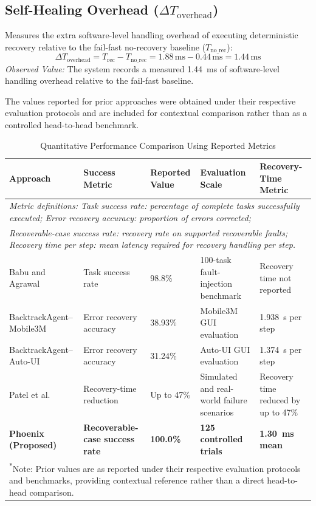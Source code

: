 \documentclass[conference]{IEEEtran}
\begin{document}
\subsection{Self-Healing Overhead ($\Delta T_{\text{overhead}}$)}
Measures the extra software-level handling overhead of executing deterministic recovery relative to the fail-fast no-recovery baseline ($T_{\text{no\_rec}}$):
\begin{equation}
\Delta T_{\text{overhead}} = T_{\text{rec}} - T_{\text{no\_rec}} = 1.88\,\text{ms} - 0.44\,\text{ms} = 1.44\,\text{ms}
\end{equation}
\textit{Observed Value:} The system records a measured 1.44~ms of software-level handling overhead relative to the fail-fast baseline.

The values reported for prior approaches were obtained under their respective evaluation protocols and are included for contextual comparison rather than as a controlled head-to-head benchmark.

\begin{table}[t]
\centering
\caption{Quantitative Performance Comparison Using Reported Metrics}
\label{tab:performance_comparison}
\footnotesize
\begin{tabularx}{\textwidth}{p{}p{}p{}p{}X}
\toprule
\textbf{Approach} & \textbf{Success Metric} & \textbf{Reported Value} & \textbf{Evaluation Scale} & \textbf{Recovery-Time Metric} \\
\midrule
\multicolumn{5}{l}{\textit{Metric definitions: Task success rate: percentage of complete tasks successfully executed; Error recovery accuracy: proportion of errors corrected;}} \\
\multicolumn{5}{l}{\textit{Recoverable-case success rate: recovery rate on supported recoverable faults; Recovery time per step: mean latency required for recovery handling per step.}} \\
\midrule
Babu and Agrawal~\cite{babu2026} & Task success rate & 98.8\% & 100-task fault-injection benchmark & Recovery time not reported \\
BacktrackAgent--Mobile3M~\cite{wu2025} & Error recovery accuracy & 38.93\% & Mobile3M GUI evaluation & 1.938~s per step \\
BacktrackAgent--Auto-UI~\cite{wu2025} & Error recovery accuracy & 31.24\% & Auto-UI GUI evaluation & 1.374~s per step \\
Patel et al.~\cite{patel2026b} & Recovery-time reduction & Up to 47\% & Simulated and real-world failure scenarios & Recovery time reduced by up to 47\% \\
\textbf{Phoenix (Proposed)} & \textbf{Recoverable-case success rate} & \textbf{100.0\%} & \textbf{125 controlled trials} & \textbf{1.30~ms mean} \\
\bottomrule
\multicolumn{5}{p{\textwidth}}{\textsuperscript{*}Note: Prior values are as reported under their respective evaluation protocols and benchmarks, providing contextual reference rather than a direct head-to-head comparison.}
\end{tabularx}
\end{table}
\end{document}

